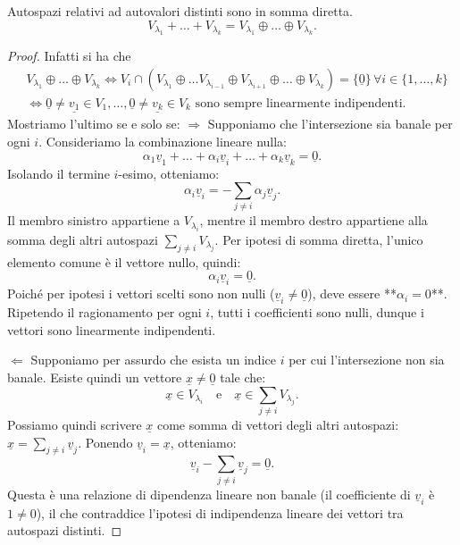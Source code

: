 \begin{cor} \label{cor:somma_dir_autospazi}
    Autospazi relativi ad autovalori distinti sono in somma diretta.
    $$
        V_{\lambda_1} + \ldots + V_{\lambda_{k}} = V_{\lambda_1} \oplus \ldots \oplus V_{\lambda_k}.
    $$
\end{cor}
\begin{proof}
    Infatti si ha che
    \begin{align}
        &V_{\lambda_1} \oplus \ldots \oplus V_{\lambda_k} \iff V_i \cap (V_{\lambda_1} \oplus \ldots V_{\lambda_{i-1}} \oplus V_{\lambda_{i+1}} \oplus \ldots \oplus V_{\lambda_k}) = \{ \underline{0} \} \, \forall i \in \{ 1, \ldots, k\} \\
        &\iff \underline{0} \neq \underline{v_1} \in V_1, \ldots, \underline{0} \neq \underline{v_k} \in V_k \text{ sono sempre linearmente indipendenti.}
    \end{align}
    Mostriamo l'ultimo se e solo se: $\boxed{\Rightarrow}$ Supponiamo che l'intersezione sia banale per ogni $i$. Consideriamo la combinazione lineare nulla:
    \[
        \alpha_1 \underline{v}_1 + \dots + \alpha_i \underline{v}_i + \dots + \alpha_k \underline{v}_k = \underline{0}.
    \]
    Isolando il termine $i$-esimo, otteniamo:
    \[
        \alpha_i \underline{v}_i = - \sum_{j \neq i} \alpha_j \underline{v}_j.
    \]
    Il membro sinistro appartiene a $V_{\lambda_i}$, mentre il membro destro appartiene alla somma degli altri autospazi $\sum_{j \neq i} V_{\lambda_j}$. 
    Per ipotesi di somma diretta, l'unico elemento comune è il vettore nullo, quindi:
    \[
        \alpha_i \underline{v}_i = \underline{0}.
    \]
    Poiché per ipotesi i vettori scelti sono non nulli ($\underline{v}_i \neq \underline{0}$), deve essere **$\alpha_i = 0$**. Ripetendo il ragionamento per ogni $i$, tutti i coefficienti sono nulli, dunque i vettori sono linearmente indipendenti.

    $\boxed{\Leftarrow}$ Supponiamo per assurdo che esista un indice $i$ per cui l'intersezione non sia banale. Esiste quindi un vettore $\underline{x} \neq \underline{0}$ tale che:
    \[
        \underline{x} \in V_{\lambda_i} \quad \text{e} \quad \underline{x} \in \sum_{j \neq i} V_{\lambda_j}.
    \]
    Possiamo quindi scrivere $\underline{x}$ come somma di vettori degli altri autospazi: $\underline{x} = \sum_{j \neq i} \underline{v}_j$. 
    Ponendo $\underline{v}_i = \underline{x}$, otteniamo:
    \[
        \underline{v}_i - \sum_{j \neq i} \underline{v}_j = \underline{0}.
    \]
    Questa è una relazione di dipendenza lineare non banale (il coefficiente di $\underline{v}_i$ è $1 \neq 0$), il che contraddice l'ipotesi di indipendenza lineare dei vettori tra autospazi distinti.
\end{proof}
